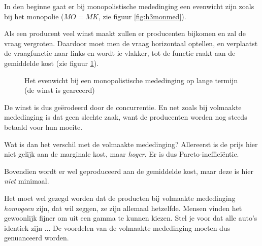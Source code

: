 In den beginne gaat er bij monopolistische mededinging een evenwicht zijn zoals bij het monopolie ($MO=MK$, zie figuur \ref{fig:h3monmed}).\\

\par Als een producent veel winst maakt zullen er producenten bijkomen en zal de vraag vergroten. Daardoor moet men de vraag horizontaal optellen, en verplaatst de vraagfunctie naar links en wordt ie vlakker, tot de functie raakt aan de gemiddelde kost (zie figuur \ref{fig:h3monmed2}).

\begin{figure}[H]
\vspace{0.5cm}
\centering
\captionsetup{justification=centering,margin=2cm}
\caption{Het evenwicht bij een monopolistische mededinging op lange termijn (de winst is gearceerd)}
\label{fig:h3monmed2}
\end{figure}

De winst is dus ge\"erodeerd door de concurrentie. En net zoals bij volmaakte mededinging is dat geen slechte zaak, want de producenten worden nog steeds betaald voor hun moeite.\\

\par Wat is dan het verschil met de volmaakte mededinging? Allereerst is de prijs hier niet gelijk aan de marginale kost, maar \textit{hoger}. Er is dus Pareto-ineffici\"entie.
\par Bovendien wordt er wel geproduceerd aan de gemiddelde kost, maar deze is hier \textit{niet} minimaal.
\par Het moet wel gezegd worden dat de producten bij volmaakte mededinging \textit{homogeen} zijn, dat wil zeggen, ze zijn allemaal hetzelfde. Mensen vinden het gewoonlijk fijner om uit een gamma te kunnen kiezen. Stel je voor dat alle auto's identiek zijn ... De voordelen van de volmaakte mededinging moeten dus genuanceerd worden. 

